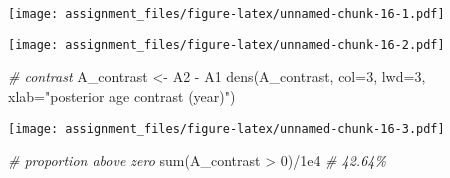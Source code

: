\documentclass[
]{article}
\newenvironment{Shaded}{\begin{snugshade}}{\end{snugshade}}
\newcommand{\AttributeTok}[1]{\textcolor[rgb]{0.77,0.63,0.00}{#1}}
\newcommand{\CommentTok}[1]{\textcolor[rgb]{0.56,0.35,0.01}{\textit{#1}}}
\newcommand{\ConstantTok}[1]{\textcolor[rgb]{0.00,0.00,0.00}{#1}}
\newcommand{\DecValTok}[1]{\textcolor[rgb]{0.00,0.00,0.81}{#1}}
\newcommand{\FloatTok}[1]{\textcolor[rgb]{0.00,0.00,0.81}{#1}}
\newcommand{\FunctionTok}[1]{\textcolor[rgb]{0.00,0.00,0.00}{#1}}
\newcommand{\NormalTok}[1]{#1}
\newcommand{\OtherTok}[1]{\textcolor[rgb]{0.56,0.35,0.01}{#1}}
\newcommand{\SpecialCharTok}[1]{\textcolor[rgb]{0.00,0.00,0.00}{#1}}
\newcommand{\StringTok}[1]{\textcolor[rgb]{0.31,0.60,0.02}{#1}}
\begin{document}
\texttt{[image: assignment\_files/figure-latex/unnamed-chunk-16-1.pdf]}

\begin{Shaded}
\end{Shaded}

\texttt{[image: assignment\_files/figure-latex/unnamed-chunk-16-2.pdf]}

\begin{Shaded}
\begin{Highlighting}[]
\CommentTok{\# contrast}
\NormalTok{A\_contrast }\OtherTok{\textless{}{-}}\NormalTok{ A2 }\SpecialCharTok{{-}}\NormalTok{ A1}
\FunctionTok{dens}\NormalTok{(A\_contrast,}
     \AttributeTok{col=}\DecValTok{3}\NormalTok{, }\AttributeTok{lwd=}\DecValTok{3}\NormalTok{,}
     \AttributeTok{xlab=}\StringTok{"posterior age contrast (year)"}\NormalTok{)}
\end{Highlighting}
\end{Shaded}

\texttt{[image: assignment\_files/figure-latex/unnamed-chunk-16-3.pdf]}

\begin{Shaded}
\begin{Highlighting}[]
\CommentTok{\# proportion above zero}
\FunctionTok{sum}\NormalTok{(A\_contrast }\SpecialCharTok{\textgreater{}} \DecValTok{0}\NormalTok{)}\SpecialCharTok{/}\FloatTok{1e4} \CommentTok{\# 42.64\%}
\end{Highlighting}
\end{Shaded}
\end{document}

